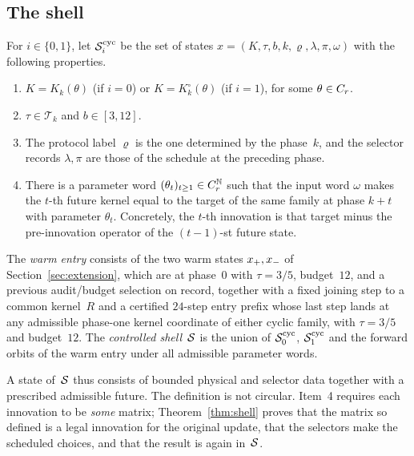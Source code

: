 \subsection{The shell}

\begin{definition}\label{def:shell}
For $i\in\{0,1\}$, let $\mathcal{S}_i^{\mathrm{cyc}}$ be the set of states $x=(K,\tau,b,k,\varrho,\lambda,\pi,\omega)$ with the following properties.
\begin{enumerate}
  \item $K=K_k(\theta)$ (if $i=0$) or $K=K^{\circ}_k(\theta)$ (if $i=1$), for some $\theta\in C_r$.
  \item $\tau\in\mathcal{T}_k$ and $b\in[3,12]$.
  \item The protocol label $\varrho$ is the one determined by the phase~$k$, and the selector records $\lambda,\pi$ are those of the schedule at the preceding phase.
  \item There is a parameter word $(\theta_t)_{t\ge1}\in C_r^{\mathbb{N}}$ such that the input word $\omega$ makes the $t$-th future kernel equal to the target of the same family at phase $k+t$ with parameter $\theta_t$. Concretely, the $t$-th innovation is that target minus the pre-innovation operator of the $(t-1)$-st future state.
\end{enumerate}
The \emph{warm entry} consists of the two warm states $x_{+},x_{-}$ of Section~\ref{sec:extension}, which are at phase~0 with $\tau=3/5$, budget~$12$, and a previous audit/budget selection on record, together with a fixed joining step to a common kernel~$R$ and a certified $24$-step entry prefix whose last step lands at any admissible phase-one kernel coordinate of either cyclic family, with $\tau=3/5$ and budget~$12$. The \emph{controlled shell}~$\mathcal{S}$ is the union of $\mathcal{S}_0^{\mathrm{cyc}}$, $\mathcal{S}_1^{\mathrm{cyc}}$ and the forward orbits of the warm entry under all admissible parameter words.
\end{definition}

A state of~$\mathcal{S}$ thus consists of bounded physical and selector data together with a prescribed admissible future. The definition is not circular. Item~4 requires each innovation to be \emph{some} matrix; Theorem~\ref{thm:shell} proves that the matrix so defined is a legal innovation for the original update, that the selectors make the scheduled choices, and that the result is again in~$\mathcal{S}$.

